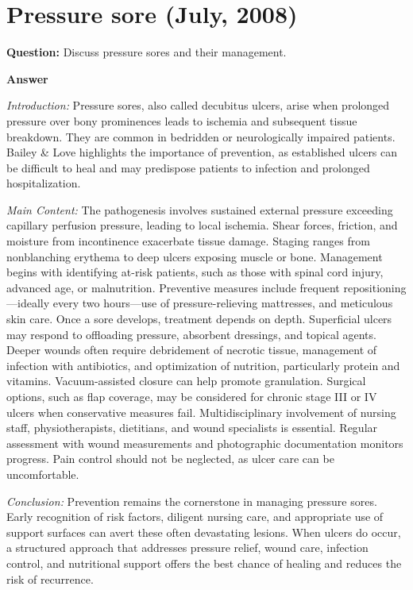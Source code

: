 \documentclass{article}
\begin{document}
\section{Pressure sore (July, 2008)}


\textbf{Question:} Discuss pressure sores and their management.

\textbf{Answer}

\emph{Introduction:} Pressure sores, also called decubitus ulcers, arise when prolonged pressure over bony prominences leads to ischemia and subsequent tissue breakdown. They are common in bedridden or neurologically impaired patients. Bailey \& Love highlights the importance of prevention, as established ulcers can be difficult to heal and may predispose patients to infection and prolonged hospitalization.

\emph{Main Content:} The pathogenesis involves sustained external pressure exceeding capillary perfusion pressure, leading to local ischemia. Shear forces, friction, and moisture from incontinence exacerbate tissue damage. Staging ranges from nonblanching erythema to deep ulcers exposing muscle or bone. Management begins with identifying at-risk patients, such as those with spinal cord injury, advanced age, or malnutrition. Preventive measures include frequent repositioning—ideally every two hours—use of pressure-relieving mattresses, and meticulous skin care. Once a sore develops, treatment depends on depth. Superficial ulcers may respond to offloading pressure, absorbent dressings, and topical agents. Deeper wounds often require debridement of necrotic tissue, management of infection with antibiotics, and optimization of nutrition, particularly protein and vitamins. Vacuum-assisted closure can help promote granulation. Surgical options, such as flap coverage, may be considered for chronic stage III or IV ulcers when conservative measures fail. Multidisciplinary involvement of nursing staff, physiotherapists, dietitians, and wound specialists is essential. Regular assessment with wound measurements and photographic documentation monitors progress. Pain control should not be neglected, as ulcer care can be uncomfortable.

\emph{Conclusion:} Prevention remains the cornerstone in managing pressure sores. Early recognition of risk factors, diligent nursing care, and appropriate use of support surfaces can avert these often devastating lesions. When ulcers do occur, a structured approach that addresses pressure relief, wound care, infection control, and nutritional support offers the best chance of healing and reduces the risk of recurrence.
\end{document}
